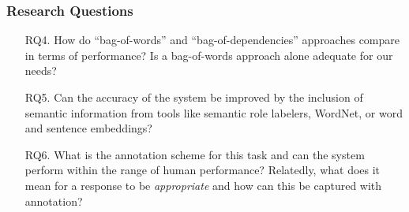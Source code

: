 \documentclass[xcolor={dvipsnames}]{beamer}
\begin{document}
\begin{frame}
\frametitle{Research Questions}
\small
\begin{itemize}
\pause
\item[RQ4.]{How do ``bag-of-words'' and ``bag-of-dependencies'' approaches compare in terms of performance? Is a bag-of-words approach alone adequate for our needs?}
\pause
\vspace{2em}
\item[RQ5.]{Can the accuracy of the system be improved by the inclusion of semantic information from tools like semantic role labelers, WordNet, or word and sentence embeddings?}

\pause
\vspace{2em}
\item[RQ6.]{What is the annotation scheme for this task and can the system perform within the range of human performance? Relatedly, what does it mean for a response to be \textit{appropriate} and how can this be captured with annotation?}
\end{itemize}
\end{frame}
\end{document}
